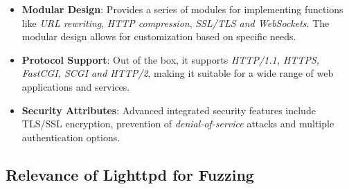 \begin{itemize}
    \item \textbf{Modular Design}: Provides a series of modules for implementing functions like \textit{URL rewriting}, \textit{HTTP compression}, \textit{SSL/TLS and WebSockets}. The modular design allows for customization based on specific needs.
    
    \item \textbf{Protocol Support}: Out of the box, it supports \textit{HTTP/1.1, HTTPS, FastCGI, SCGI and HTTP/2}, making it suitable for a wide range of web applications and services.
    
    \item \textbf{Security Attributes}: Advanced integrated security features include TLS/SSL encryption, prevention of \textit{denial-of-service} attacks and multiple authentication options.
\end{itemize}

\subsection{Relevance of Lighttpd for Fuzzing}

